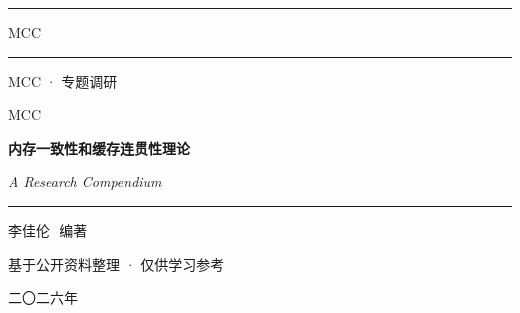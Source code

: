 
\begin{titlepage}
\thispagestyle{empty}
\pagecolor{qianhui}

\vspace*{28mm}
\noindent
\hfill\textcolor{zhusha}{\rule{40mm}{1pt}}\hspace{4mm}\textsf{\small MCC}\hspace{4mm}\textcolor{zhusha}{\rule{40mm}{1pt}}

\vspace{4mm}
\begin{center}
{\small\color{shenhui}MCC · 专题调研}
\end{center}

\vspace{45mm}

\begin{center}
{\color{zhusha}\Huge\sffamily MCC}

\vspace{12mm}

{\LARGE\bfseries 内存一致性和缓存连贯性理论}

\vspace{14mm}

{\large\itshape\color{shenhui} A Research Compendium}
\end{center}

\vfill

\vspace{30mm}
\begin{center}
\textcolor{zhusha}{\rule{60mm}{0.4pt}}

\vspace{6mm}
{\Large 李佳伦\,\, 编著}

\vspace{4mm}
{\small\color{shenhui} 基于公开资料整理 · 仅供学习参考}

\vspace{14mm}
{\large 二〇二六年}
\end{center}

\vspace{14mm}

\clearpage
\nopagecolor
\end{titlepage}
